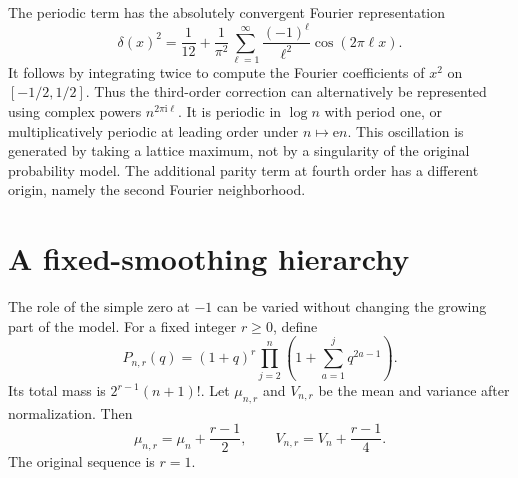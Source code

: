 \documentclass[11pt,a4paper]{article}
\numberwithin{equation}{section}
\theoremstyle{definition}\newtheorem{definition}[theorem]{Definition}
\theoremstyle{remark}\newtheorem{remark}[theorem]{Remark}
\newcommand{\ee}{\mathrm e}
\newcommand{\ii}{\mathrm i}
\begin{document}
The periodic term has the absolutely convergent Fourier representation
\begin{equation}\label{tfp:eq:periodicfourier}
 \delta(x)^2=\frac1{12}
       +\frac1{\pi^2}\sum_{\ell=1}^{\infty}
                  \frac{(-1)^\ell}{\ell^2}\cos(2\pi\ell x).
\end{equation}
It follows by integrating twice to compute the Fourier coefficients of
$x^2$ on $[-1/2,1/2]$. Thus the third-order correction can alternatively
be represented using complex powers $n^{2\pi\ii\ell}$. It is periodic
in $\log n$ with period one, or multiplicatively periodic at leading
order under $n\mapsto\ee n$. This oscillation is generated by taking a
lattice maximum, not by a singularity of the original probability
model. The additional parity term at fourth order has a different
origin, namely the second Fourier neighborhood.

\section{A fixed-smoothing hierarchy}\label{tfp:sec:smoothing}
The role of the simple zero at $-1$ can be varied without changing the
growing part of the model. For a fixed integer $r\ge0$, define
\begin{equation}\label{tfp:eq:Pr}
 P_{n,r}(q)=(1+q)^r\prod_{j=2}^n
              \left(1+\sum_{a=1}^j q^{2a-1}\right).
\end{equation}
Its total mass is $2^{r-1}(n+1)!$. Let $\mu_{n,r}$ and $V_{n,r}$ be the
mean and variance after normalization. Then
\begin{equation}
 \mu_{n,r}=\mu_n+\frac{r-1}{2},\qquad
 V_{n,r}=V_n+\frac{r-1}{4}.
\end{equation}
The original sequence is $r=1$.
\end{document}
